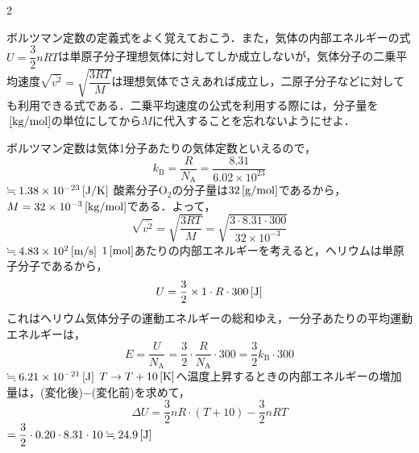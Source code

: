 \newpage

\setlength{\columnseprule}{0.4pt}
\begin{multicols}{2}
\raggedcolumns

\par\nopagebreak
\begin{sisin}
ボルツマン定数の定義式をよく覚えておこう．また，気体の内部エネルギーの式$U=\dfrac{3}{2}nRT$は単原子分子理想気体に対してしか成立しないが，気体分子の二乗平均速度$\sqrt{\overline{v^2}}=\sqrt{\dfrac{3RT}{M}}$は理想気体でさえあれば成立し，二原子分子などに対しても利用できる式である．二乗平均速度の公式を利用する際には，分子量を$\,[\mathrm{kg/mol}]$の単位にしてから$M$に代入することを忘れないようにせよ．
\end{sisin}
\KaiHead
\begin{komon}
 ボルツマン定数は気体1分子あたりの気体定数といえるので，
       \[k_{\mathrm{B}}=\frac{R}{N_{\mathrm{A}}}=\frac{8.31}{6.02\times 10^{23}}\]
       \hspace*{2zw}$\fallingdotseq 1.38\times 10^{-23}\,[\mathrm{J/K}]$\Ans
{} 酸素分子$\mathrm{O_2}$の分子量は$32\,[\mathrm{g/mol}]$であるから，$M=32\times 10^{-3}\,[\mathrm{kg/mol}]$である．よって，
       \[\sqrt{\overline{v^2}}=\sqrt{\frac{3RT}{M}}=\sqrt{\frac{3\cdot 8.31\cdot 300}{32\times 10^{-3}}}\]
       \hspace*{2zw}$\fallingdotseq 4.83\times 10^2\,[\mathrm{m/s}]$\Ans
{} $1\,[\mathrm{mol}]$あたりの内部エネルギーを考えると，ヘリウムは単原子分子であるから，
       \[U=\frac{3}{2}\times 1\cdot R\cdot 300\,[\mathrm{J}]\]
       これはヘリウム気体分子の運動エネルギーの総和ゆえ，一分子あたりの平均運動エネルギーは，
       \[E=\frac{U}{N_{\mathrm{A}}}=\frac{3}{2}\cdot\frac{R}{N_{\mathrm{A}}}\cdot 300=\frac{3}{2}k_{\mathrm{B}}\cdot 300\]
       \hspace*{2zw}$\fallingdotseq 6.21\times 10^{-21}\,[\mathrm{J}]$\Ans
{} $T\to T+10\,[\mathrm{K}]$へ温度上昇するときの内部エネルギーの増加量は，(変化後)$-$(変化前)を求めて，
       \[\Delta U=\frac{3}{2}nR\cdot(T+10)-\frac{3}{2}nRT\]
       \hspace*{2zw}$=\dfrac{3}{2}\cdot 0.20\cdot 8.31\cdot 10\fallingdotseq 24.9\,[\mathrm{J}]$\Ans
\end{komon}


\end{multicols}
